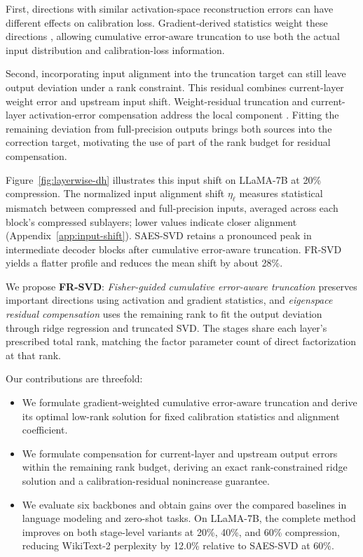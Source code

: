 \documentclass[11pt]{article}
\begin{document}
First, directions with similar activation-space reconstruction errors can have different effects on calibration loss. Gradient-derived statistics weight these directions \citep{hsu2022fwsvd,chekalina2025gfwsvd}, allowing cumulative error-aware truncation to use both the actual input distribution and calibration-loss information.

Second, incorporating input alignment into the truncation target can still leave output deviation under a rank constraint. This residual combines current-layer weight error and upstream input shift. Weight-residual truncation and current-layer activation-error compensation address the local component \citep{bai2025ercsvd,liu2025eora}. Fitting the remaining deviation from full-precision outputs brings both sources into the correction target, motivating the use of part of the rank budget for residual compensation.

Figure~\ref{fig:layerwise-dh} illustrates this input shift on LLaMA-7B at 20\% compression. The normalized input alignment shift $\eta_\ell$ measures statistical mismatch between compressed and full-precision inputs, averaged across each block's compressed sublayers; lower values indicate closer alignment (Appendix~\ref{app:input-shift}). SAES-SVD retains a pronounced peak in intermediate decoder blocks after cumulative error-aware truncation. FR-SVD yields a flatter profile and reduces the mean shift by about 28\%.



We propose \textbf{FR-SVD}: \emph{Fisher-guided cumulative error-aware truncation} preserves important directions using activation and gradient statistics, and \emph{eigenspace residual compensation} uses the remaining rank to fit the output deviation through ridge regression and truncated SVD. The stages share each layer's prescribed total rank, matching the factor parameter count of direct factorization at that rank.

Our contributions are threefold:
\begin{itemize}
\item We formulate gradient-weighted cumulative error-aware truncation and derive its optimal low-rank solution for fixed calibration statistics and alignment coefficient.
\item We formulate compensation for current-layer and upstream output errors within the remaining rank budget, deriving an exact rank-constrained ridge solution and a calibration-residual nonincrease guarantee.
\item We evaluate six backbones and obtain gains over the compared baselines in language modeling and zero-shot tasks. On LLaMA-7B, the complete method improves on both stage-level variants at 20\%, 40\%, and 60\% compression, reducing WikiText-2 perplexity by 12.0\% relative to SAES-SVD at 60\%.
\end{itemize}
\end{document}
